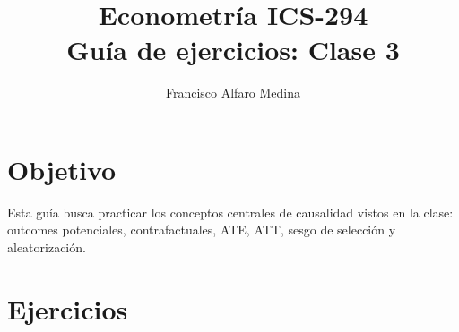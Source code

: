 \documentclass[11pt]{article}
\title{Econometría ICS-294\\Guía de ejercicios: Clase 3}
\author{Francisco Alfaro Medina}
\date{}
\begin{document}
\maketitle

\section*{Objetivo}

Esta guía busca practicar los conceptos centrales de causalidad vistos en la clase: outcomes potenciales, contrafactuales, ATE, ATT, sesgo de selección y aleatorización.

\section*{Ejercicios}
\end{document}
